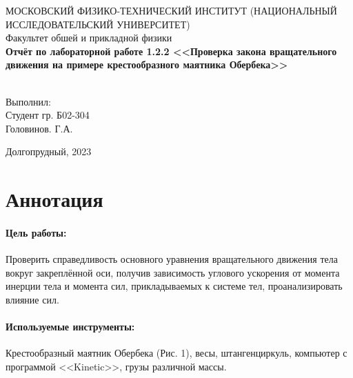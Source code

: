 \documentclass[a4paper,12pt]{article}
\begin{document}
	
	\begin{center}
		МОСКОВСКИЙ ФИЗИКО-ТЕХНИЧЕСКИЙ ИНСТИТУТ (НАЦИОНАЛЬНЫЙ ИССЛЕДОВАТЕЛЬСКИЙ УНИВЕРСИТЕТ) \\
		
		
		\hfill \break
		Факультет обшей и прикладной физики\\
		\vspace{2.5cm}
		\large{\textbf{Отчёт по лабораторной работе 1.2.2 <<Проверка закона вращательного движения на примере крестообразного маятника Обербека>>}}\\
		\hfill \break
		\\
	\end{center}
	
	\vspace{5cm}
	
	\begin{flushright}
		Выполнил:\\
		Студент гр. Б02-304\\
		Головинов. Г.А.
	\end{flushright}
	
	\vfill
	
	
	\begin{center} Долгопрудный, 2023 \end{center}
	
	\thispagestyle{empty}
	\newpage
	
	
	\section{Аннотация}
	\paragraph{Цель работы:} \hspace{-2mm} Проверить справедливость основного уравнения вращательного движения тела вокруг закреплённой оси, получив зависимость углового ускорения от момента инерции тела и момента сил, прикладываемых к системе тел, проанализировать влияние сил.
	\paragraph{Используемые инструменты:} \hspace{-2mm} Крестообразный маятник Обербека (Рис. 1), весы, штангенциркуль, компьютер с программой <<Kinetic>>, грузы различной массы. 
\end{document}

